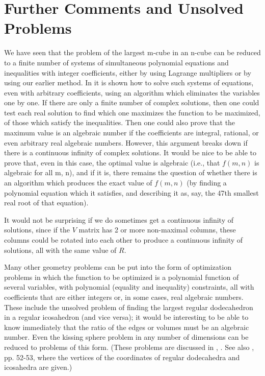 \section*{Further Comments and Unsolved Problems}

We have seen that the problem of the largest m-cube in an n-cube
can be reduced to a finite number of systems of simultaneous polynomial
equations and inequalities with integer coefficients, either by using
Lagrange multipliers or by using our earlier method. In \cite{cox1992} it
is shown how to solve such systems of equations, even with arbitrary
coefficients, using an algorithm which eliminates the variables one by one.
If there are only a finite number of complex solutions, then one could test
each real solution to find which one maximizes the function to be maximized, of
those which satisfy the inequalities. Then one could also prove that the
maximum value is an algebraic number if the coefficients are integral,
rational, or even arbitrary real algebraic numbers. However, this
argument breaks down if there is a continuous infinity of complex
solutions. It would be nice to be able to prove that, even in this case, the
optimal value is algebraic (i.e., that $f(m,n)$ is algebraic for all m, n), and
if it is, there remains the question of whether there is an algorithm which
produces the exact value of $f(m,n)$ (by finding a polynomial equation
which it satisfies, and describing it as, say, the 47th smallest real root
of that equation).

It would not be surprising if we do sometimes get a continuous
infinity of solutions, since if the $V$ matrix has 2 or more non-maximal
columns, these columns could be rotated into each other to produce a
continuous infinity of solutions, all with the same value of $R$.

Many other geometry problems can be put into the form of
optimization problems in which the function to be optimized is a
polynomial function of several variables, with polynomial (equality and
inequality) constraints, all with coefficients that are either integers or,
in some cases, real algebraic numbers. These include the unsolved
problem of finding the largest regular dodecahedron in a regular
icosahedron (and vice versa); it would be interesting to be able to know
immediately that the ratio of the edges or volumes must be an algebraic
number. Even the kissing sphere problem in any number of dimensions can
be reduced to problems of this form. (These problems are discussed in
\cite{croft1991}, \cite{croft1980maximal}. See also
\cite{coxeter1973}, pp.  52-53, where the vertices of the coordinates of
regular dodecahedra and icosahedra are given.)

